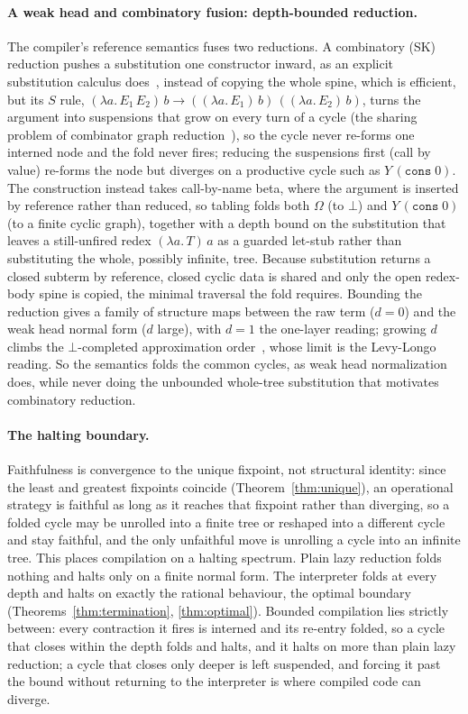 \paragraph{A weak head and combinatory fusion: depth-bounded reduction.}
The compiler's reference semantics fuses two reductions. A combinatory (SK) reduction pushes a
substitution one constructor inward, as an explicit substitution calculus
does~, instead of copying the whole spine, which is
efficient, but its $S$ rule, $(\lambda a.\,E_1\,E_2)\,b \to ((\lambda a.\,E_1)\,b)\,((\lambda a.\,E_2)\,b)$,
turns the argument into suspensions that grow on every turn of a cycle (the sharing problem of
combinator graph reduction~), so the cycle never re-forms one
interned node and the fold never fires; reducing the suspensions first (call by value) re-forms the node but
diverges on a productive cycle such as $Y\,(\mathtt{cons}\;0)$. The construction instead takes
call-by-name beta, where the argument is inserted by reference rather than reduced, so tabling folds
both $\Omega$ (to $\bot$) and $Y\,(\mathtt{cons}\;0)$ (to a finite cyclic graph), together with a depth
bound on the substitution that leaves a still-unfired redex $(\lambda a.\,T)\,a$ as a guarded let-stub
rather than substituting the whole, possibly infinite, tree. Because substitution returns a closed
subterm by reference, closed cyclic data is shared and only the open redex-body spine is copied, the
minimal traversal the fold requires. Bounding the reduction gives a family of structure maps between
the raw term ($d = 0$) and the weak head normal form ($d$ large), with $d = 1$ the one-layer reading;
growing $d$ climbs the $\bot$-completed approximation order~, whose
limit is the Levy-Longo reading. So
the semantics folds the common cycles, as weak head normalization does, while never doing the
unbounded whole-tree substitution that motivates combinatory reduction.

\paragraph{The halting boundary.}
Faithfulness is convergence to the unique fixpoint, not structural identity: since the least and
greatest fixpoints coincide (Theorem~\ref{thm:unique}), an operational strategy is faithful as long
as it reaches that fixpoint rather than diverging, so a folded cycle may be unrolled into a finite
tree or reshaped into a different cycle and stay faithful, and the only unfaithful move is unrolling a
cycle into an infinite tree. This places compilation on a halting spectrum. Plain lazy reduction folds
nothing and halts only on a finite normal form. The interpreter folds at every depth and halts on
exactly the rational behaviour, the optimal boundary (Theorems~\ref{thm:termination},
\ref{thm:optimal}). Bounded compilation lies strictly between: every contraction it fires is interned
and its re-entry folded, so a cycle that closes within the depth folds and halts, and it halts on more
than plain lazy reduction; a cycle that closes only deeper is left suspended, and forcing it past the
bound without returning to the interpreter is where compiled code can diverge.

